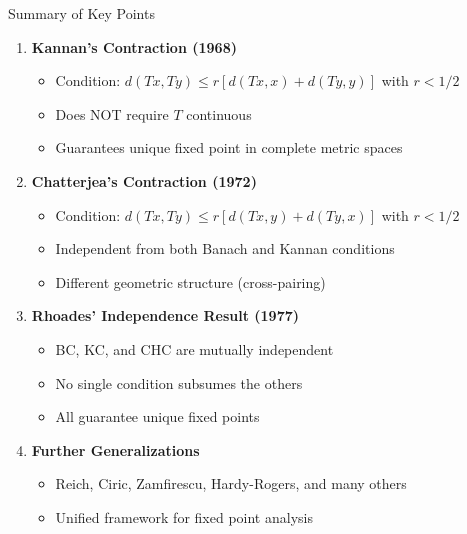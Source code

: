 \documentclass[aspectratio=169,10pt]{beamer}
\begin{document}
\begin{frame}{Summary of Key Points}
    \begin{enumerate}
        \item \textbf{Kannan's Contraction (1968)}
        \begin{itemize}
            \item Condition: $d(Tx, Ty) \leq r[d(Tx, x) + d(Ty, y)]$ with $r < 1/2$
            \item Does NOT require $T$ continuous
            \item Guarantees unique fixed point in complete metric spaces
        \end{itemize}

        \item \textbf{Chatterjea's Contraction (1972)}
        \begin{itemize}
            \item Condition: $d(Tx, Ty) \leq r[d(Tx, y) + d(Ty, x)]$ with $r < 1/2$
            \item Independent from both Banach and Kannan conditions
            \item Different geometric structure (cross-pairing)
        \end{itemize}

        \item \textbf{Rhoades' Independence Result (1977)}
        \begin{itemize}
            \item BC, KC, and CHC are mutually independent
            \item No single condition subsumes the others
            \item All guarantee unique fixed points
        \end{itemize}

        \item \textbf{Further Generalizations}
        \begin{itemize}
            \item Reich, Ciric, Zamfirescu, Hardy-Rogers, and many others
            \item Unified framework for fixed point analysis
        \end{itemize}
    \end{enumerate}
\end{frame}
\end{document}
